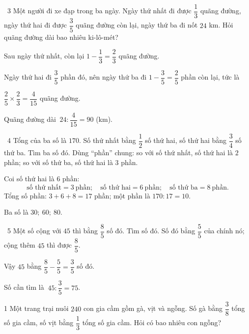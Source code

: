 \gap
\begin{exbox}{\ExWord\ 3}
Một người đi xe đạp trong ba ngày. Ngày thứ nhất đi được $\dfrac13$ quãng đường, ngày thứ hai đi được $\dfrac35$ quãng đường còn lại, ngày thứ ba đi nốt $24$ km. Hỏi quãng đường dài bao nhiêu ki-lô-mét?
\guide
\begin{barfigC}
\end{barfigC}
Sau ngày thứ nhất, còn lại $1-\dfrac13=\dfrac23$ quãng đường.\par
Ngày thứ hai đi $\dfrac35$ phần đó, nên ngày thứ ba đi $1-\dfrac35=\dfrac25$ phần còn lại, tức là\par $\dfrac25\times\dfrac23=\dfrac4{15}$ quãng đường.\par
Quãng đường dài $\ 24:\dfrac4{15}=90$ (km).
\end{exbox}
\gap
\begin{exbox}{\ExWord\ 4}
Tổng của ba số là $170$. Số thứ nhất bằng $\dfrac12$ số thứ hai, số thứ hai bằng $\dfrac34$ số thứ ba. Tìm ba số đó.
\guide
Dùng ``phần'' chung: so với số thứ nhất, số thứ hai là $2$ phần; so với số thứ ba, số thứ hai là $3$ phần.\par Coi số thứ hai là $6$ phần:
\[\text{số thứ nhất}=3\ \text{phần};\quad\text{số thứ hai}=6\ \text{phần};\quad\text{số thứ ba}=8\ \text{phần}.\]
Tổng số phần: $3+6+8=17$ phần; một phần là $170:17=10$.\par
Ba số là $30;\ 60;\ 80$.
\end{exbox}
\gap
\begin{exbox}{\ExWord\ 5}
Một số cộng với $45$ thì bằng $\dfrac85$ số đó. Tìm số đó.
\guide
Số đó bằng $\dfrac55$ của chính nó; cộng thêm $45$ thì được $\dfrac85$.\par Vậy $45$ bằng $\dfrac85-\dfrac55=\dfrac35$ số đó.\par
Số cần tìm là $\ 45:\dfrac35=75$.
\end{exbox}
\begin{probbox}{1}{\relax}
Một trang trại nuôi $240$ con gia cầm gồm gà, vịt và ngỗng. Số gà bằng $\dfrac38$ tổng số gia cầm, số vịt bằng $\dfrac13$ tổng số gia cầm. Hỏi có bao nhiêu con ngỗng?
\end{probbox}
